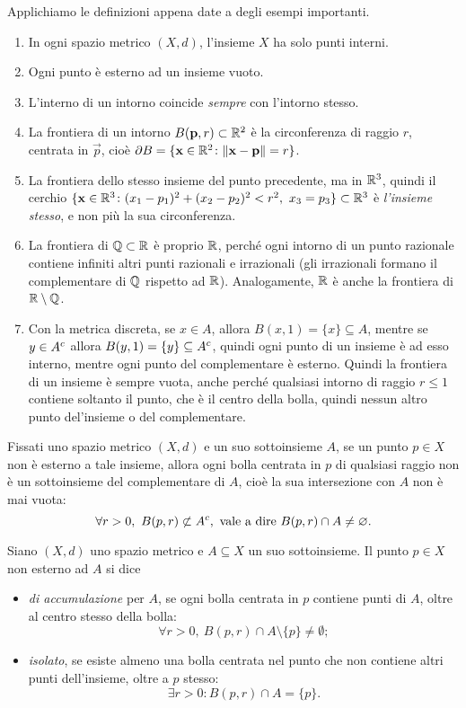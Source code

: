 \begin{esempio} \label{es:punti-interni-esterni}
	Applichiamo le definizioni appena date a degli esempi importanti.
	\begin{enumerate}
		\item In ogni spazio metrico $(X,d)$, l'insieme $X$ ha solo punti interni.
		\item Ogni punto è esterno ad un insieme vuoto.
		\item L'interno di un intorno coincide \emph{sempre} con l'intorno stesso.
		\item La frontiera di un intorno $B(\mathbf{p},r)\subset\mathbb{R}^2$ è la circonferenza di raggio $r$, centrata in $\vec p$, cioè $\partial B=\{\mathbf{x}\in\mathbb{R}^2\colon\lVert\mathbf{x}-\mathbf{p}\rVert=r\}$.
		\item La frontiera dello stesso insieme del punto precedente, ma in $\mathbb{R}^3$, quindi il cerchio $\{\vec x\in\R^3\colon(x_1-p_1)^2+(x_2-p_2)^2<r^2,\ x_3=p_3\}\subset\R^3$ è \emph{l'insieme stesso}, e non più la sua circonferenza.
		\item La frontiera di $\mathbb{Q}\subset\mathbb{R}$ è proprio $\mathbb{R}$, perché ogni intorno di un punto razionale contiene infiniti altri punti razionali e irrazionali (gli irrazionali formano il complementare di $\mathbb{Q}$ rispetto ad $\mathbb{R}$). Analogamente, $\mathbb{R}$ è anche la frontiera di $\mathbb{R}\setminus\mathbb{Q}$.
		\item Con la metrica discreta, se $x\in A$, allora $B(x,1)=\{x\}\subseteq A$, mentre se $y\in{A}^c$ allora $B(y,1)=\{y\}\subseteq{A}^c$, quindi ogni punto di un insieme è ad esso interno, mentre ogni punto del complementare è esterno. Quindi la frontiera di un insieme è sempre vuota, anche perché qualsiasi intorno di raggio $r\leq 1$ contiene soltanto il punto, che è il centro della bolla, quindi nessun altro punto del'insieme o del complementare.
	\end{enumerate}
\end{esempio}
\begin{osservazione}
Fissati uno spazio metrico $(X,d)$ e un suo sottoinsieme $A$, se un punto $p\in X$ non è esterno a tale insieme, allora ogni bolla centrata in $p$ di qualsiasi raggio non è un sottoinsieme del complementare di $A$, cioè la sua intersezione con $A$ non è mai vuota:
\[
	\forall r>0,\ B(p,r)\not\subset\compl{A},\text{ vale a dire }B(p,r)\cap A\neq\emptyset.
\]
\end{osservazione}
\begin{definizione}
Siano $(X,d)$ uno spazio metrico e $A\subseteq X$ un suo sottoinsieme. Il punto $p\in X$ non esterno ad $A$ si dice
\begin{itemize}
\item \emph{di accumulazione} per $A$, se ogni bolla centrata in $p$ contiene punti di $A$, oltre al centro stesso della bolla:
\[
\forall r>0,\ B(p,r)\cap A\setminus\{p\}\neq\emptyset;
\]
\item \emph{isolato}, se esiste almeno una bolla centrata nel punto che non contiene altri punti dell'insieme, oltre a $p$ stesso:
\[
\exists r>0\colon B(p,r)\cap A=\{p\}.%
\]
\end{itemize}
\end{definizione}
